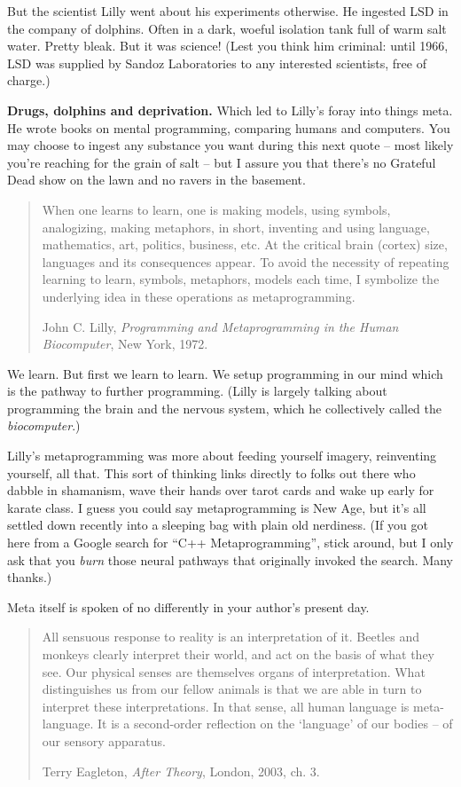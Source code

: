 \documentclass[12pt,twoside]{report}
\begin{document}
But the scientist Lilly went about his experiments otherwise.  He
ingested LSD in the company of dolphins. Often in a dark, woeful
isolation tank full of warm salt water.  Pretty bleak.  But it was
science!  (Lest you think him criminal: until 1966, LSD was supplied
by Sandoz Laboratories to any interested scientists, free of charge.)

{\bf Drugs, dolphins and deprivation.}  Which led to Lilly's foray
into things meta.  He wrote books on mental programming, comparing
humans and computers.  You may choose to ingest any substance you want
during this next quote -- most likely you're reaching for the grain of
salt -- but I assure you that there's no Grateful Dead show on the
lawn and no ravers in the basement.

\begin{quote}
When one learns to learn, one is making models, using symbols,
analogizing, making metaphors, in short, inventing and using language,
mathematics, art, politics, business, etc. At the critical brain
(cortex) size, languages and its consequences appear. To avoid the
necessity of repeating learning to learn, symbols, metaphors, models
each time, I symbolize the underlying idea in these operations as
metaprogramming.

John C. Lilly, {\em Programming and Metaprogramming in the Human
  Biocomputer}, New York, 1972.

\end{quote}


We learn.  But first we learn to learn.  We setup programming in our
mind which is the pathway to further programming.  (Lilly is largely
talking about programming the brain and the nervous system, which he
collectively called the {\em biocomputer}.)

Lilly's metaprogramming was more about feeding yourself imagery,
reinventing yourself, all that. This sort of thinking links directly
to folks out there who dabble in shamanism, wave their hands over
tarot cards and wake up early for karate class.  I guess you could say
metaprogramming is New Age, but it's all settled down recently into a
sleeping bag with plain old nerdiness.  (If you got here from a Google
search for ``C++ Metaprogramming'', stick around, but I only ask that
you {\em burn} those neural pathways that originally invoked the
search.  Many thanks.)

Meta itself is spoken of no differently in your author's present day.

\begin{quote}
All sensuous response to reality is an interpretation of it.  Beetles
and monkeys clearly interpret their world, and act on the basis of
what they see. Our physical senses are themselves organs of
interpretation.  What distinguishes us from our fellow animals is that
we are able in turn to interpret these interpretations.  In that
sense, all human language is meta-language.  It is a second-order
reflection on the `language' of our bodies -- of our sensory
apparatus.

Terry Eagleton, {\em After Theory}, London, 2003, ch. 3.

\end{quote}
\end{document}
